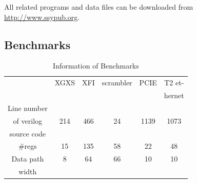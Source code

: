 \documentclass[journal]{IEEEtran}
\begin{document}
All related programs and data files can be downloaded from \url{http://www.ssypub.org}.
\subsection{Benchmarks}
\begin{table}[!t]
\centering
\caption{Information of Benchmarks}
\begin{tabular}{|c|c|c|c|c|c|}
\hline
&XGXS&XFI&scrambler&PCIE&T2 et-\\
&&&&&hernet\\\hline
Line number&&&&&\\
of verilog&214&466&24&1139&1073\\
source code&&&&&\\\hline
\#regs&15&135&58&22&48\\\hline
Data path&8&64&66&10&10\\
width&&&&&\\ \hline
\end{tabular}
\end{table}



\end{document}
